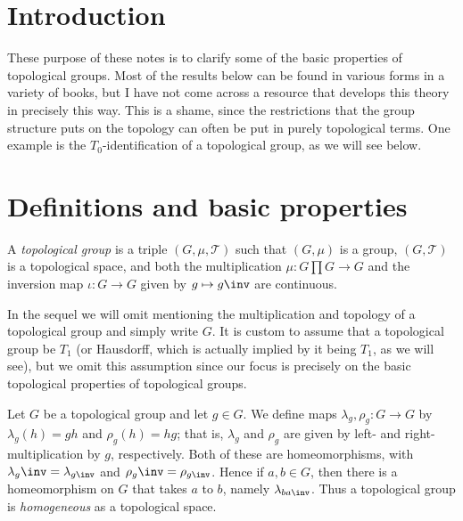 \documentclass[article, a4paper, 11pt, oneside]{memoir}
\title{\doctitle}
\author{\docauthor}
\numberwithin{equation}{chapter}
\newcommand{\calT}{\mathcal{T}}
\begin{document}
\maketitle

\chapter{Introduction}

These purpose of these notes is to clarify some of the basic properties of topological groups. Most of the results below can be found in various forms in a variety of books, but I have not come across a resource that develops this theory in precisely this way. This is a shame, since the restrictions that the group structure puts on the topology can often be put in purely topological terms. One example is the $T_0$-identification of a topological group, as we will see below.


\chapter{Definitions and basic properties}

\begin{definition}
    \label{def:topological_group}
    A \emph{topological group} is a triple $(G, \mu, \calT)$ such that $(G, \mu)$ is a group, $(G, \calT)$ is a topological space, and both the multiplication $\mu \colon G \prod G \to G$ and the inversion map $\iota \colon G \to G$ given by $g \mapsto g\inv$ are continuous.
\end{definition}
%
In the sequel we will omit mentioning the multiplication and topology of a topological group and simply write $G$. It is custom to assume that a topological group be $T_1$ (or Hausdorff, which is actually implied by it being $T_1$, as we will see), but we omit this assumption since our focus is precisely on the basic topological properties of topological groups.

\newcommand{\leftmult}{\lambda}
\newcommand{\rightmult}{\rho}

Let $G$ be a topological group and let $g \in G$. We define maps $\leftmult_g, \rightmult_g \colon G \to G$ by $\leftmult_g(h) = gh$ and $\rightmult_g(h) = hg$; that is, $\leftmult_g$ and $\rightmult_g$ are given by left- and right-multiplication by $g$, respectively. Both of these are homeomorphisms, with $\leftmult_g\inv = \leftmult_{g\inv}$ and $\rightmult_g\inv = \rightmult_{g\inv}$. Hence if $a, b \in G$, then there is a homeomorphism on $G$ that takes $a$ to $b$, namely $\leftmult_{ba\inv}$. Thus a topological group is \emph{homogeneous} as a topological space.
\end{document}
